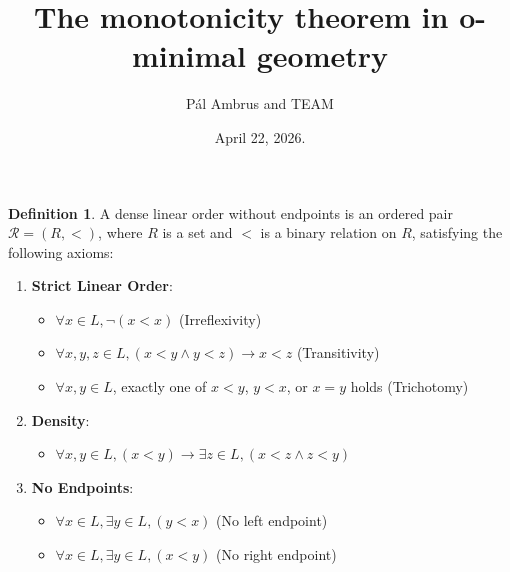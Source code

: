 \documentclass{amsart}
\numberwithin{equation}{subsection}
\theoremstyle{plain}
\theoremstyle{definition}
\newtheorem{defn}[subsection]{Definition}
\theoremstyle{remark}
\begin{document}
\title{The monotonicity theorem in o-minimal geometry}
\author{P\'al Ambrus and TEAM}
\address{Geometria tansz\'ek, E\"oltv\"os Lor\'and Tudom\'anyegyetem, 1117 Budapest, P\'azm\'any P\'eter s\'et\'any 1/C}
\date{April 22, 2026.}
\maketitle

\begin{defn} A dense linear order without endpoints is an ordered pair
$\mathcal{R} =(R, <)$, where $R$ is a set and $<$ is a binary relation on $R$, satisfying the following axioms:
\begin{enumerate}
\item \textbf{Strict Linear Order}:
\begin{itemize}
\item $\forall x \in L, \neg(x < x)$ (Irreflexivity)
\item $\forall x, y, z \in L, (x < y \land y < z) \to x < z$ (Transitivity)
\item $\forall x, y \in L$, exactly one of $x < y$, $y < x$, or $x = y$ holds (Trichotomy)
\end{itemize}
\item \textbf{Density}:
\begin{itemize}
\item $\forall x, y \in L, (x < y) \to \exists z \in L, (x < z \land z < y)$
\end{itemize}
\item \textbf{No Endpoints}:
\begin{itemize}
\item $\forall x \in L, \exists y \in L, (y < x)$ (No left endpoint)
\item $\forall x \in L, \exists y \in L, (x < y)$ (No right endpoint)
\end{itemize}
\end{enumerate}
\end{defn}
\end{document}

